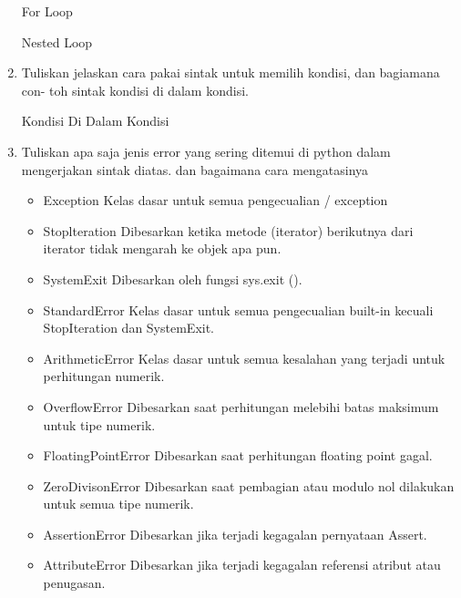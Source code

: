 \begin{enumerate}
    For Loop
    

    Nested Loop
    

    \item Tuliskan jelaskan cara pakai sintak untuk memilih kondisi, dan bagiamana con-
    toh sintak kondisi di dalam kondisi.
    

    Kondisi Di Dalam Kondisi
    

    \item Tuliskan apa saja jenis error yang sering ditemui di python dalam mengerjakan
    sintak diatas. dan bagaimana cara mengatasinya
    \begin{itemize}
        \item Exception
        Kelas dasar untuk semua pengecualian / exception

        \item Stoplteration
        Dibesarkan ketika metode (iterator) berikutnya dari iterator tidak mengarah ke objek apa pun.

        \item SystemExit
        Dibesarkan oleh fungsi sys.exit ().

        \item StandardError
        Kelas dasar untuk semua pengecualian built-in kecuali StopIteration dan SystemExit.

        \item ArithmeticError
        Kelas dasar untuk semua kesalahan yang terjadi untuk perhitungan numerik.

        \item OverflowError
        Dibesarkan saat perhitungan melebihi batas maksimum untuk tipe numerik.

        \item FloatingPointError
        Dibesarkan saat perhitungan floating point gagal.

        \item ZeroDivisonError
        Dibesarkan saat pembagian atau modulo nol dilakukan untuk semua tipe numerik.

        \item AssertionError
        Dibesarkan jika terjadi kegagalan pernyataan Assert.

        \item AttributeError
        Dibesarkan jika terjadi kegagalan referensi atribut atau penugasan.
         

\end{itemize}
\end{enumerate}
